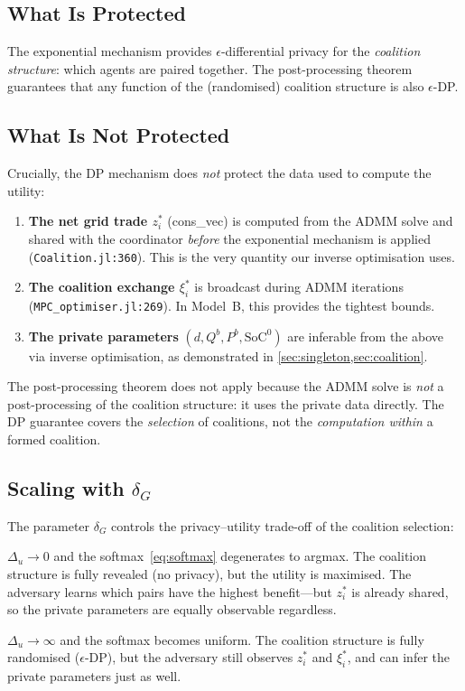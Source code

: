 \documentclass[11pt,a4paper]{article}
\newcommand{\netload}{d}
\newcommand{\Qb}{{Q^b}}
\newcommand{\Pb}{{P^b}}
\newcommand{\SoC}{{\text{SoC}^0}}
\newcommand{\ce}{\xi}
\begin{document}
\subsection{What Is Protected}

The exponential mechanism provides $\epsilon$-differential privacy for the \emph{coalition structure}: which agents are paired together. The post-processing theorem guarantees that any function of the (randomised) coalition structure is also $\epsilon$-DP.

\subsection{What Is Not Protected}

Crucially, the DP mechanism does \emph{not} protect the data used to compute the utility:
\begin{enumerate}[nosep]
    \item \textbf{The net grid trade $z_i^*$} (cons\_vec) is computed from the ADMM solve and shared with the coordinator \emph{before} the exponential mechanism is applied (\texttt{Coalition.jl:360}). This is the very quantity our inverse optimisation uses.
    \item \textbf{The coalition exchange $\ce_i^*$} is broadcast during ADMM iterations (\texttt{MPC\_optimiser.jl:269}). In Model~B, this provides the tightest bounds.
    \item \textbf{The private parameters} $(\netload, \Qb, \Pb, \SoC)$ are inferable from the above via inverse optimisation, as demonstrated in \cref{sec:singleton,sec:coalition}.
\end{enumerate}

The post-processing theorem does not apply because the ADMM solve is \emph{not} a post-processing of the coalition structure: it uses the private data directly. The DP guarantee covers the \emph{selection} of coalitions, not the \emph{computation within} a formed coalition.

\subsection{Scaling with $\delta_G$}

The parameter $\delta_G$ controls the privacy--utility trade-off of the coalition selection:

\begin{description}[nosep]
    \item[$\delta_G \to 0$ (deterministic):] $\Delta_u \to 0$ and the softmax~\eqref{eq:softmax} degenerates to argmax. The coalition structure is fully revealed (no privacy), but the utility is maximised. The adversary learns which pairs have the highest benefit---but $z_i^*$ is already shared, so the private parameters are equally observable regardless.
    \item[$\delta_G \to \infty$ (uniform):] $\Delta_u \to \infty$ and the softmax becomes uniform. The coalition structure is fully randomised ($\epsilon$-DP), but the adversary still observes $z_i^*$ and $\ce_i^*$, and can infer the private parameters just as well.
\end{description}
\end{document}
